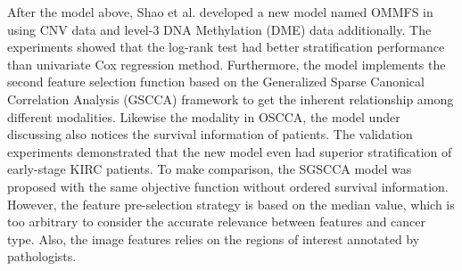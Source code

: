 \documentclass[journal,twoside,web]{ieeecolor}
\begin{document}
After the model above, Shao et al. developed a new model named OMMFS in \cite{shao2019integrative} using CNV data and level-3 DNA Methylation (DME) data additionally.
The experiments showed that the log-rank test\cite{cheng2017integrative} had better stratification performance than univariate Cox regression method.
Furthermore, the model implements the second feature selection function based on the Generalized Sparse Canonical Correlation Analysis (GSCCA) framework\cite{witten2009extensions} to get the inherent relationship among different modalities.
Likewise the modality in OSCCA, the model under discussing also notices the survival information of patients.
The validation experiments demonstrated that the new model even had superior stratification of early-stage KIRC patients.
To make comparison, the SGSCCA model was proposed with the same objective function without ordered survival information.
However, the feature pre-selection strategy is based on the median value, which is too arbitrary to consider the accurate relevance between features and cancer type.
Also, the image features relies on the regions of interest annotated by pathologists.
\end{document}
